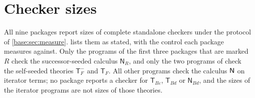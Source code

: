 \section{Checker sizes}
\label{seed:sec:sizes}

All nine packages report sizes of complete standalone checkers under the
protocol of \cref{base:sec:measure}.  lists them as
stated, with the control each package measures against. Only the programs
of the first three packages that are marked $R$ check the successor-seeded
calculus $\mathsf{N}_R$, and only the two programs of
 check the self-seeded theories $\mathsf{T}_F^{-}$
and $\mathsf{T}_F$. All other programs check the calculus $\mathsf{N}$ on
iterator terms; no package reports a checker for
$\mathsf{T}_{B\varepsilon}$, $\mathsf{T}_{Bd}$ or $\mathsf{N}_{Bd}$, and the
sizes of the iterator programs are not sizes of those theories.

